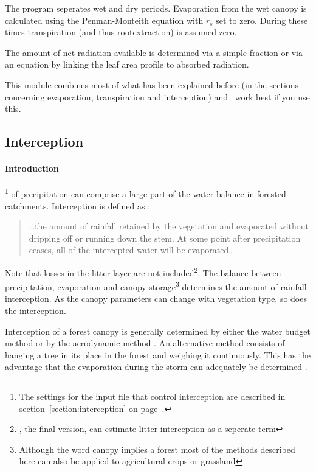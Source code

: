 The program seperates wet and dry periods.  Evaporation from the wet
canopy is calculated using the Penman-Monteith equation with $r_s$ set
to zero.  During these times transpiration (and thus rootextraction)
is assumed zero.

The amount of net radiation available is determined via a simple
fraction or via an equation by  linking the
leaf area profile to absorbed radiation.

This module combines most of what has been explained before (in the
sections concerning evaporation, transpiration and interception) and
\vamps\ work best if you use this.


\subsection{Interception}\label{sec:interception}

\paragraph{Introduction}\footnote{The settings for the input file that control interception are described in section~\ref{section:interception} on
page~\pageref{section:interception}.}
 of precipitation can comprise a large part of the water
balance in forested catchments.  Interception is defined as
\cite{leonard1967184}:
\begin{quote}
\ldots the amount of rainfall retained by the vegetation and evaporated
without dripping off or running down the stem. At some point after 
precipitation ceases, all of the intercepted water will be evaporated\ldots
\end{quote}
Note that losses in the litter layer are not included\footnote{\vamps
, the final version, can estimate litter interception as a seperate
term}.  The balance between precipitation, evaporation and canopy
storage\footnote{Although the word canopy implies a forest most of the
methods described here can also be applied to agricultural crops or
grassland} \cite{rutter1971174} determines the amount of rainfall
interception.  As the canopy parameters can change with vegetation
type, so does the interception.

Interception of a forest canopy is generally determined by either the
water budget method or by the aerodynamic method
\cite{tsukamoto1989185}.  An alternative method consists of hanging a
tree in its place in the forest and weighing it continuously. This has
the advantage that the evaporation during the storm can adequately
be determined \cite{tsukamoto1989185}.

